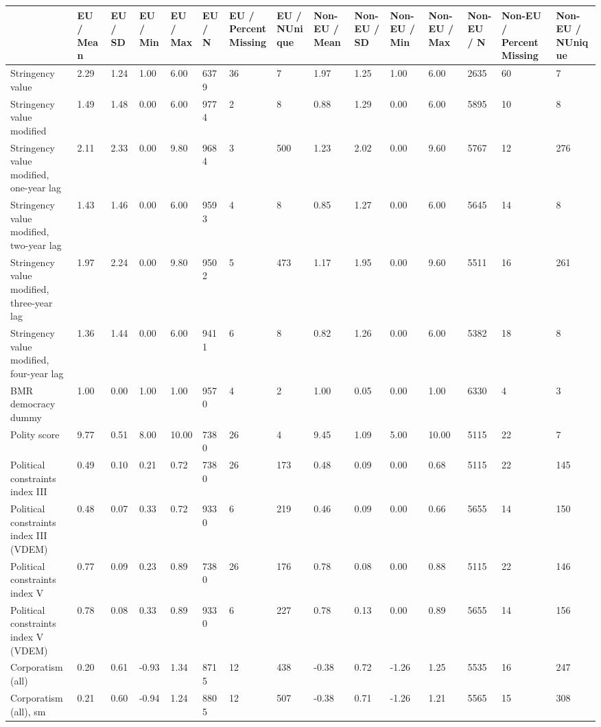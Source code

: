 
\begin{longtable}{lllllllllllllll}
\toprule
  & EU / Mean & EU / SD & EU / Min & EU / Max & EU / N & EU / PercentMissing & EU / NUnique & Non-EU / Mean & Non-EU / SD & Non-EU / Min & Non-EU / Max & Non-EU / N & Non-EU / PercentMissing & Non-EU / NUnique\\
\midrule
Stringency value & 2.29 & 1.24 & 1.00 & 6.00 & 6379 & 36 & 7 & 1.97 & 1.25 & 1.00 & 6.00 & 2635 & 60 & 7\\
Stringency value modified & 1.49 & 1.48 & 0.00 & 6.00 & 9774 & 2 & 8 & 0.88 & 1.29 & 0.00 & 6.00 & 5895 & 10 & 8\\
Stringency value modified, one-year lag & 2.11 & 2.33 & 0.00 & 9.80 & 9684 & 3 & 500 & 1.23 & 2.02 & 0.00 & 9.60 & 5767 & 12 & 276\\
Stringency value modified, two-year lag & 1.43 & 1.46 & 0.00 & 6.00 & 9593 & 4 & 8 & 0.85 & 1.27 & 0.00 & 6.00 & 5645 & 14 & 8\\
Stringency value modified, three-year lag & 1.97 & 2.24 & 0.00 & 9.80 & 9502 & 5 & 473 & 1.17 & 1.95 & 0.00 & 9.60 & 5511 & 16 & 261\\
\addlinespace
Stringency value modified, four-year lag & 1.36 & 1.44 & 0.00 & 6.00 & 9411 & 6 & 8 & 0.82 & 1.26 & 0.00 & 6.00 & 5382 & 18 & 8\\
BMR democracy dummy & 1.00 & 0.00 & 1.00 & 1.00 & 9570 & 4 & 2 & 1.00 & 0.05 & 0.00 & 1.00 & 6330 & 4 & 3\\
Polity score & 9.77 & 0.51 & 8.00 & 10.00 & 7380 & 26 & 4 & 9.45 & 1.09 & 5.00 & 10.00 & 5115 & 22 & 7\\
Political constraints index III & 0.49 & 0.10 & 0.21 & 0.72 & 7380 & 26 & 173 & 0.48 & 0.09 & 0.00 & 0.68 & 5115 & 22 & 145\\
Political constraints index III (VDEM) & 0.48 & 0.07 & 0.33 & 0.72 & 9330 & 6 & 219 & 0.46 & 0.09 & 0.00 & 0.66 & 5655 & 14 & 150\\
\addlinespace
Political constraints index V & 0.77 & 0.09 & 0.23 & 0.89 & 7380 & 26 & 176 & 0.78 & 0.08 & 0.00 & 0.88 & 5115 & 22 & 146\\
Political constraints index V (VDEM) & 0.78 & 0.08 & 0.33 & 0.89 & 9330 & 6 & 227 & 0.78 & 0.13 & 0.00 & 0.89 & 5655 & 14 & 156\\
Corporatism (all) & 0.20 & 0.61 & -0.93 & 1.34 & 8715 & 12 & 438 & -0.38 & 0.72 & -1.26 & 1.25 & 5535 & 16 & 247\\
Corporatism (all), sm & 0.21 & 0.60 & -0.94 & 1.24 & 8805 & 12 & 507 & -0.38 & 0.71 & -1.26 & 1.21 & 5565 & 15 & 308\\

\end{longtable}

